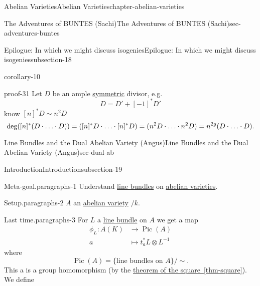 \documentclass[oneside,10pt,]{book}
\renewcommand{\qedhere}{\relax}
\numberwithin{equation}{section}
\newcommand{\lb}{[}
\newcommand{\rb}{]}
\DeclareMathOperator{\Pic}{Pic}
\newcommand{\amp}{&}
\begin{document}
\begin{chapterptx}{Abelian Varieties}{}{Abelian Varieties}{}{}{chapter-abelian-varieties}
\begin{sectionptx}{The Adventures of BUNTES (Sachi)}{}{The Adventures of BUNTES (Sachi)}{}{}{sec-adventures-buntes}
\begin{subsectionptx}{Epilogue: In which we might discuss isogenies}{}{Epilogue: In which we might discuss isogenies}{}{}{subsection-18}
\begin{corollary}{}{}{corollary-10}
\end{corollary}
\begin{proofptx}{}{proof-31}
\hypertarget{p-162}{}%
Let \(D\) be an ample \hyperref[def-princ-pol]{symmetric} divisor, e.g.%
\begin{equation*}
D = D' + [-1]^* D'
\end{equation*}
know \(\lb n \rb^* D \sim n^2 D\)%
\begin{equation*}
\deg([n]^*(D\cdot\ldots\cdot D)) = ([n]^*D\cdot \ldots\cdot [n]^*D) = (n^2 D\cdot\ldots\cdot n^2 D)= n^{2g} (D\cdot \ldots\cdot D)\text{.}\qedhere
\end{equation*}
%
\end{proofptx}
\end{subsectionptx}
\end{sectionptx}
%
%
\typeout{************************************************}
\typeout{************************************************}
%
\begin{sectionptx}{Line Bundles and the Dual Abelian Variety (Angus)}{}{Line Bundles and the Dual Abelian Variety (Angus)}{}{}{sec-dual-ab}
%
%
\typeout{************************************************}
\typeout{************************************************}
%
\begin{subsectionptx}{Introduction}{}{Introduction}{}{}{subsection-19}
\begin{paragraphs}{Meta-goal.}{paragraphs-1}%
\hypertarget{p-163}{}%
Understand \hyperref[def-line-bundle]{line bundles} on \hyperref[def-buntes-abvar]{abelian varieties}.%
\end{paragraphs}%
\begin{paragraphs}{Setup.}{paragraphs-2}%
\hypertarget{p-164}{}%
\(A\) an \hyperref[def-buntes-abvar]{abelian variety} \(/k\).%
\end{paragraphs}%
\begin{paragraphs}{Last time.}{paragraphs-3}%
\hypertarget{p-165}{}%
For \(L\) a \hyperref[def-line-bundle]{line bundle} on \(A\) we get a map%
\begin{align*}
\phi_L\colon A(K) \amp\to \Pic(A)\\
a\amp\mapsto t_a^* L\otimes L^{-1}
\end{align*}
where%
\begin{equation*}
\Pic(A) = \{\text{line bundles on } A\}/\sim\text{.}
\end{equation*}
This a is a group homomorphism (by the \hyperref[thm-square]{theorem of the square~\ref{thm-square}}). We define%

\end{paragraphs}
\end{subsectionptx}
\end{sectionptx}
\end{chapterptx}
\end{document}
